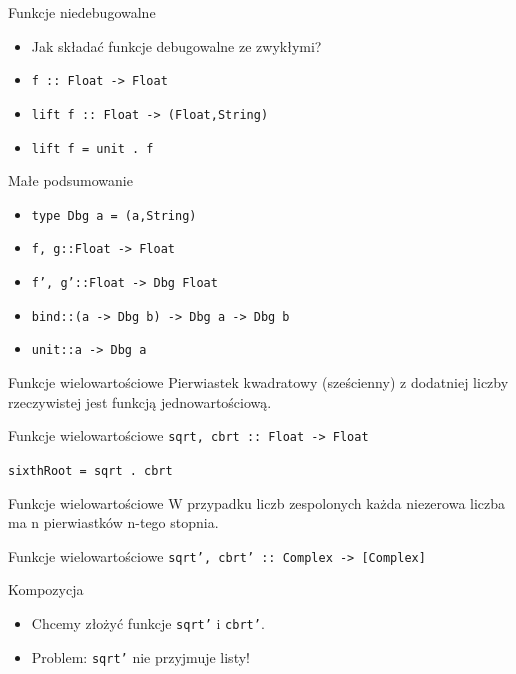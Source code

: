 \documentclass[14pt]{beamer}
\begin{document}
\begin{frame}{Funkcje niedebugowalne}
    \begin{itemize}
        \item Jak składać funkcje debugowalne ze zwykłymi?
        \item \texttt{f  :: Float -> Float}
        \item \texttt{lift f :: Float -> (Float,String)}
        \pause
        \item \texttt{lift f = unit . f}
    \end{itemize}
\end{frame}

\begin{frame}{Małe podsumowanie}
    \begin{itemize}
        \item \texttt{type Dbg a = (a,String)}
        \item \texttt{f, g::Float -> Float}
        \item \texttt{f', g'::Float -> Dbg Float}
        \item \texttt{bind::(a -> Dbg b) -> Dbg a -> Dbg b}
        \item \texttt{unit::a -> Dbg a}
    \end{itemize}
\end{frame}


\begin{frame}{Funkcje wielowartościowe}
    Pierwiastek kwadratowy (sześcienny) z dodatniej liczby rzeczywistej
    jest funkcją jednowartościową.
\end{frame}

\begin{frame}{Funkcje wielowartościowe}
    \texttt{sqrt, cbrt :: Float -> Float}
    \pause

    \texttt{sixthRoot = sqrt . cbrt}
\end{frame}

\begin{frame}{Funkcje wielowartościowe}
    W przypadku liczb zespolonych każda niezerowa liczba ma n pierwiastków
    n-tego stopnia.
\end{frame}

\begin{frame}{Funkcje wielowartościowe}
    \texttt{sqrt', cbrt' :: Complex -> [Complex]}
\end{frame}

\begin{frame}{Kompozycja}
    \begin{itemize}
        \item Chcemy złożyć funkcje \texttt{sqrt'} i \texttt{cbrt'}.
        \item Problem: \texttt{sqrt'} nie przyjmuje listy!
    \end{itemize}
\end{frame}
\end{document}
